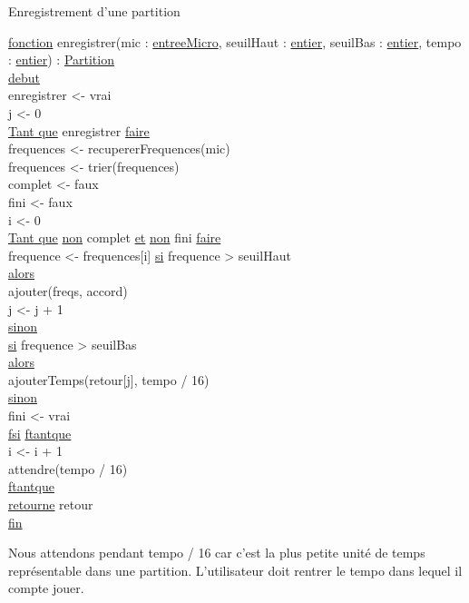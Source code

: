 Enregistrement d'une partition\newline
\begin{tabbing}
\ul{fonction} enregistrer(mic : \ul{entreeMicro}, seuilHaut :  \ul{entier}, seuilBas : \ul{entier}, tempo : \ul{entier}) : \ul{Partition}\\
\ul{debut}\\
enregistrer <- vrai\\
j <- 0\\
\ul{Tant que} enregistrer \ul{faire}\\
    frequences <- recupererFrequences(mic)\\
    frequences <- trier(frequences)\\
    complet <- faux\\
    fini <- faux\\
    i <- 0 \\
    \ul{Tant que} \ul{non} complet \ul{et} \ul{non} fini \ul{faire}\\
        frequence <- frequences[i]
        \ul{si} frequence > seuilHaut\\
        \ul{alors}\\
            ajouter(freqs, accord)\\
            j <- j + 1\\
        \ul{sinon}\\
            \ul{si} frequence > seuilBas\\
            \ul{alors}\\ 
                ajouterTemps(retour[j], tempo / 16)\\
            \ul{sinon}\\
                fini <- vrai\\
        \ul{fsi}
    \ul{ftantque}\\     
    i <- i + 1\\  
    attendre(tempo / 16)\\
\ul{ftantque}\\
\ul{retourne} retour \\
\ul{fin}\\
\end{tabbing}

Nous attendons pendant tempo / 16 car c'est la plus petite unité de temps représentable dans une partition. L'utilisateur doit rentrer le tempo dans lequel il compte jouer.


